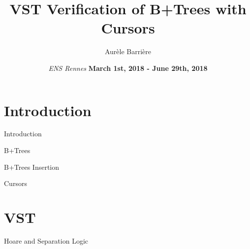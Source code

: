 \documentclass[page number]{beamer}
\def\outline{
  \begin{frame}[plain,noframenumbering]
    \frametitle{Outline}
    \tableofcontents[currentsection]
  \end{frame}
}
\begin{document}
\title[shorttitle]{VST Verification of B+Trees with Cursors}

\author[Aur\`ele Barri\`ere]{Aur\`ele Barri\`ere}

\date{\textit{ENS Rennes}
  \vfill
  \textbf{March 1st, 2018 - June 29th, 2018}}

\def\outline{
  \begin{frame}[plain,noframenumbering]
    \frametitle{Outline}
    \tableofcontents[currentsection]
  \end{frame}
}

\begin{frame}
  \vspace{-2cm}
  \maketitle
  \vspace{-4cm}
\end{frame}



\section{Introduction}
\begin{frame}{Introduction}
\end{frame}

\begin{frame}{B+Trees}


\end{frame}

\begin{frame}{B+Trees Insertion}
\end{frame}

\begin{frame}{Cursors}


\end{frame}

\section{VST}
\begin{frame}{Hoare and Separation Logic}

  
\end{frame}
\end{document}
